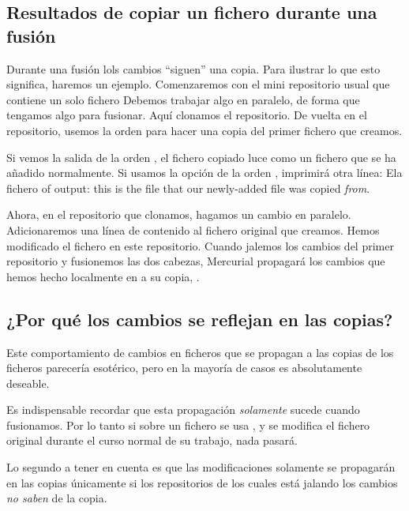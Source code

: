 \subsection{Resultados de copiar un fichero durante una fusión}

Durante una fusión lols cambios ``siguen'' una copia.  Para ilustrar
lo que esto significa, haremos un ejemplo.  Comenzaremos con el mini
repositorio usual que contiene un solo fichero
Debemos trabajar algo en paralelo, de forma que tengamos algo para
fusionar. Aquí clonamos el repositorio.
De vuelta en el repositorio, usemos la orden  para hacer
una copia del primer fichero que creamos.

Si vemos la salida de la orden , el fichero copiado luce
como un fichero que se ha añadido normalmente.
Si usamos la opción  de la orden ,
imprimirá otra línea: Ela fichero of output: this is the file that our newly-added
file was copied \emph{from}.

Ahora, en el repositorio que clonamos, hagamos un cambio en
paralelo. Adicionaremos una línea de contenido al fichero original que
creamos.
Hemos modificado el fichero  en este
repositorio. Cuando jalemos los cambios del primer repositorio y
fusionemos las dos cabezas, Mercurial propagará los cambios que hemos
hecho localmente en  a su copia, .

\subsection{¿Por qué los cambios se reflejan en las copias?}
\label{sec:daily:why-copy}

Este comportamiento de cambios en ficheros que se propagan a las
copias de los ficheros parecería esotérico, pero en la mayoría de
casos es absolutamente deseable.

Es indispensable recordar que esta propagación \emph{solamente} sucede
cuando fusionamos.  Por lo tanto si sobre un fichero se usa
, y se modifica el fichero original durante el curso
normal de su trabajo, nada pasará.

Lo segundo a tener en cuenta es que las modificaciones solamente se
propagarán en las copias únicamente si los repositorios de los cuales
está jalando los cambios \emph{no saben} de la copia.


